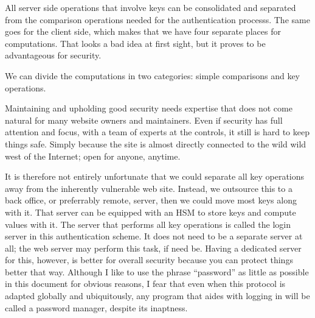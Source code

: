 All server side operations that involve keys can be consolidated and separated from the comparison operations needed for the authentication processs.
The same goes for the client side, which makes that we have four separate places for computations.
That looks a bad idea at first sight, but it proves to be advantageous for security.
\par
We can divide the computations in two categories: simple comparisons and key operations.
\par
Maintaining and upholding good security needs expertise that does not come natural for many website owners and maintainers.
Even if security has full attention and focus, with a team of experts at the controls, it still is hard to keep things safe.
Simply because the site is almost directly connected to the wild wild west of the Internet; open for anyone, anytime.
\par
It is therefore not entirely unfortunate that we could separate all key operations away from the inherently vulnerable web site.
Instead, we outsource this to a back office, or preferrably remote, server, then we could move most keys along with it.
That server can be equipped with an HSM to store keys and compute values with it.
The server that performs all key operations is called the login server in this authentication scheme.
It does not need to be a separate server at all; the web server may perform this task, if need be.
Having a dedicated server for this, however, is better for overall security because you can protect things better that way.
Although I like to use the phrase ``password'' as little as possible in this document for obvious reasons,
I fear that even when this protocol is adapted globally and ubiquitously,
any program that aides with logging in will be called a password manager,
despite its inaptness.
